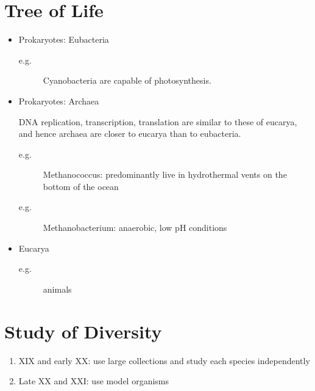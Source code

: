 \documentclass[11pt]{scrartcl}
\begin{document}
\section{Tree of Life}

\begin{itemize}
\item Prokaryotes: Eubacteria

  \begin{description}

  \item[e.g.] Cyanobacteria are capable of photosynthesis.

  \end{description}

\item Prokaryotes: Archaea

  DNA replication, transcription, translation are similar to these of
  eucarya, and hence archaea are closer to eucarya than to eubacteria.

  \begin{description}

  \item[e.g.] Methanococcus: predominantly live in hydrothermal vents on the bottom of the ocean

  \item[e.g.] Methanobacterium: anaerobic, low pH conditions

  \end{description}


\item Eucarya

  \begin{description}

  \item[e.g.] animals

  \end{description}
\end{itemize}

\section{Study of Diversity}

\begin{enumerate}
\item\label{item:1} XIX and early XX: use large collections and study
  each species independently
\item\label{item:2} Late XX and XXI: use model organisms
\end{enumerate}
\end{document}
